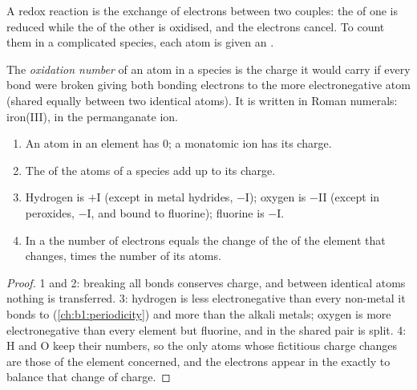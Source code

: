 A redox reaction is the exchange of electrons between two couples: the
 of one is reduced while the  of the other is oxidised,
and the electrons cancel. To count them in a complicated species, each
atom is given an .

\begin{definition}\label{def:b1:nernst:oxidation-number}
The \emph{oxidation number} of an atom in a
species is the charge it would carry if every bond were broken giving
both bonding electrons to the more electronegative atom (shared equally
between two identical atoms). It is written in Roman numerals: iron(III),
 in the permanganate ion.
\end{definition}

\begin{proposition}\label{prop:b1:nernst:on-rules}
\begin{enumerate}
  \item An atom in an element has  0; a monatomic ion has
        its charge.
  \item The  of the atoms of a species add up to its
        charge.
  \item Hydrogen is $+$I (except in metal hydrides, $-$I); oxygen is
        $-$II (except in peroxides, $-$I, and bound to fluorine); fluorine
        is $-$I.
  \item In a  the number of electrons equals the change of
        the  of the element that changes, times the
        number of its atoms.
\end{enumerate}
\end{proposition}

\begin{proof}
1 and 2: breaking all bonds conserves charge, and between identical atoms
nothing is transferred. 3: hydrogen is less electronegative than every
non-metal it bonds to (\cref{ch:b1:periodicity}) and more than the alkali
metals; oxygen is more electronegative than every element but fluorine,
and in  the shared pair is split. 4: H and O keep their numbers,
so the only atoms whose fictitious charge changes are those of the element
concerned, and the electrons appear in the  exactly to
balance that change of charge.
\end{proof}

